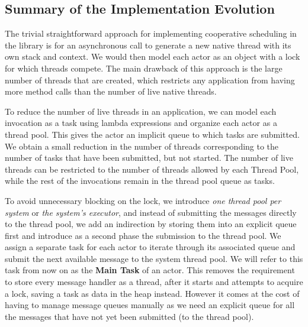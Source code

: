 \subsection{Summary of the Implementation Evolution}
\par The trivial straightforward approach for implementing cooperative scheduling in the library is for an asynchronous call to generate a new native thread with its own stack and context. We would then model each actor as an object with a lock for which threads compete. The main drawback of this approach is the large number of threads that are created, which restricts any application from having more method calls than the number of live native threads. 
\par To reduce the number of live threads in an application, we can model each invocation as a task using lambda expressions and organize each actor as a thread pool. This gives the actor an implicit queue to which tasks are submitted. We obtain a small reduction in the number of threads corresponding to the number of tasks that have been submitted, but not started. The number of live threads can be restricted to the number of threads allowed by each Thread Pool, while the rest of the invocations remain in the thread pool queue as tasks.
\par To avoid unnecessary blocking on the lock, we introduce \textit{one thread pool per system} or \textit{the system's executor}, and instead of submitting the messages directly to the thread pool, we add an indirection by storing them into an explicit queue first and introduce as a second phase the submission to the thread pool. We assign a separate task for each actor to iterate through its associated queue and submit the next available message to the system thread pool. We will refer to this task from now on as the \textbf{Main Task} of an actor. This removes the requirement to store every message handler as a thread, after it starts and attempts to acquire a lock, saving a task as data in the heap instead. However it comes at the cost of having to manage message queues manually as we need an explicit queue for all the messages that have not yet been submitted (to the thread pool). 



